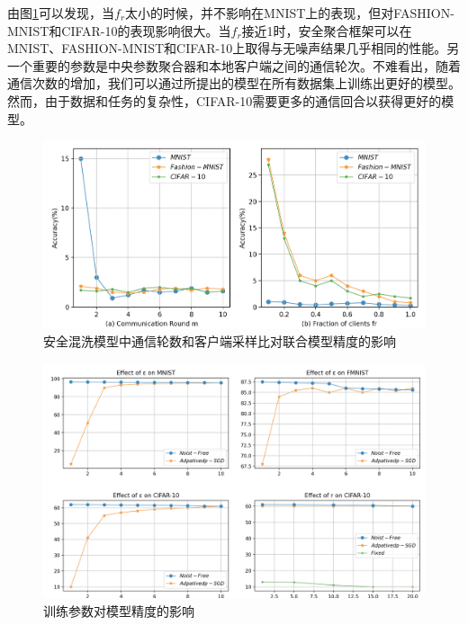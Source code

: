 由图\ref{fig:安全混洗模型中通信轮数和客户端采样比对联合模型精度的影响}可以发现，当$f_{r}$太小的时候，并不影响在MNIST上的表现，但对FASHION-MNIST和CIFAR-10的表现影响很大。当$f_{r}$接近1时，安全聚合框架可以在MNIST、FASHION-MNIST和CIFAR-10上取得与无噪声结果几乎相同的性能。另一个重要的参数是中央参数聚合器和本地客户端之间的通信轮次。不难看出，随着通信次数的增加，我们可以通过所提出的模型在所有数据集上训练出更好的模型。然而，由于数据和任务的复杂性，CIFAR-10需要更多的通信回合以获得更好的模型。

\begin{figure}[!hbt]
\centering
  	\includegraphics[scale=0.4]{fig2/C5/SA-FL2}%
	\caption{安全混洗模型中通信轮数和客户端采样比对联合模型精度的影响}
  	\label{fig:安全混洗模型中通信轮数和客户端采样比对联合模型精度的影响} 
\end{figure}

\begin{figure}[!hbt]
\centering
  	\includegraphics[scale=0.38]{fig2/C5/SA-FL对比实验}%
	\caption{训练参数对模型精度的影响}
  	\label{fig:[a-c]: 隐私预算对模型准确率的影响; [d]: 参数r对模型准确率的影响} 
\end{figure}

